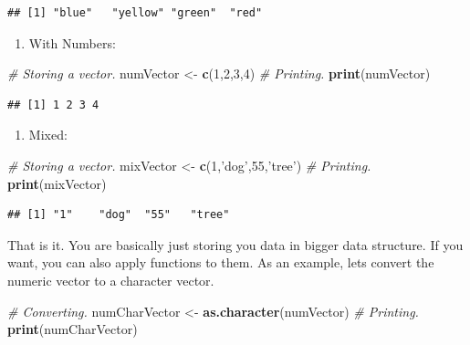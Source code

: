 \documentclass[]{book}
\newenvironment{Shaded}{\begin{snugshade}}{\end{snugshade}}
\newcommand{\CommentTok}[1]{\textcolor[rgb]{0.56,0.35,0.01}{\textit{#1}}}
\newcommand{\DecValTok}[1]{\textcolor[rgb]{0.00,0.00,0.81}{#1}}
\newcommand{\KeywordTok}[1]{\textcolor[rgb]{0.13,0.29,0.53}{\textbf{#1}}}
\newcommand{\NormalTok}[1]{#1}
\newcommand{\StringTok}[1]{\textcolor[rgb]{0.31,0.60,0.02}{#1}}
\providecommand{\tightlist}{%
  \setlength{\itemsep}{0pt}\setlength{\parskip}{0pt}}
\begin{document}
\begin{verbatim}
## [1] "blue"   "yellow" "green"  "red"
\end{verbatim}

\begin{enumerate}
\def\labelenumi{\arabic{enumi}.}
\setcounter{enumi}{1}
\tightlist
\item
  With Numbers:
\end{enumerate}

\begin{Shaded}
\begin{Highlighting}[]
\CommentTok{# Storing a vector.}
\NormalTok{numVector <-}\StringTok{ }\KeywordTok{c}\NormalTok{(}\DecValTok{1}\NormalTok{,}\DecValTok{2}\NormalTok{,}\DecValTok{3}\NormalTok{,}\DecValTok{4}\NormalTok{)}
\CommentTok{# Printing.}
\KeywordTok{print}\NormalTok{(numVector)}
\end{Highlighting}
\end{Shaded}

\begin{verbatim}
## [1] 1 2 3 4
\end{verbatim}

\begin{enumerate}
\def\labelenumi{\arabic{enumi}.}
\setcounter{enumi}{2}
\tightlist
\item
  Mixed:
\end{enumerate}

\begin{Shaded}
\begin{Highlighting}[]
\CommentTok{# Storing a vector.}
\NormalTok{mixVector <-}\StringTok{ }\KeywordTok{c}\NormalTok{(}\DecValTok{1}\NormalTok{,}\StringTok{'dog'}\NormalTok{,}\DecValTok{55}\NormalTok{,}\StringTok{'tree'}\NormalTok{)}
\CommentTok{# Printing.}
\KeywordTok{print}\NormalTok{(mixVector)}
\end{Highlighting}
\end{Shaded}

\begin{verbatim}
## [1] "1"    "dog"  "55"   "tree"
\end{verbatim}

That is it. You are basically just storing you data in bigger data structure. If you want, you can also apply functions to them. As an example, lets convert the numeric vector to a character vector.

\begin{Shaded}
\begin{Highlighting}[]
\CommentTok{# Converting.}
\NormalTok{numCharVector <-}\StringTok{ }\KeywordTok{as.character}\NormalTok{(numVector)}
\CommentTok{# Printing.}
\KeywordTok{print}\NormalTok{(numCharVector)}
\end{Highlighting}
\end{Shaded}
\end{document}
